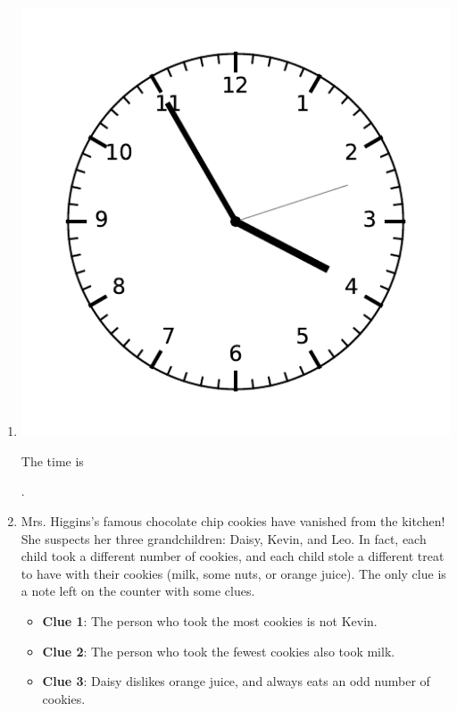 \documentclass{tufte-book}
\begin{document}
\begin{enumerate}

\item \begin{marginfigure}\includegraphics[width=\textwidth]{fig/clock_0355.pdf}\end{marginfigure}
The time is \dotfill\bigskip\par\dotfill\bigskip.\par

\item Mrs. Higgins's famous chocolate chip cookies have vanished from the kitchen! 
She suspects her three grandchildren: Daisy, Kevin, and Leo. In fact, each child took a different number of cookies,
and each child stole a different treat to have with their cookies (milk, some nuts, or orange juice).
The only clue is a note left on the counter with some clues.

\begin{itemize}
  \item \textbf{Clue 1}: The person who took the most cookies is not Kevin.
  \item \textbf{Clue 2}: The person who took the fewest cookies also took milk.
  \item \textbf{Clue 3}: Daisy dislikes orange juice, and always eats an odd number of cookies.
\end{itemize}


\end{enumerate}
\end{document}
